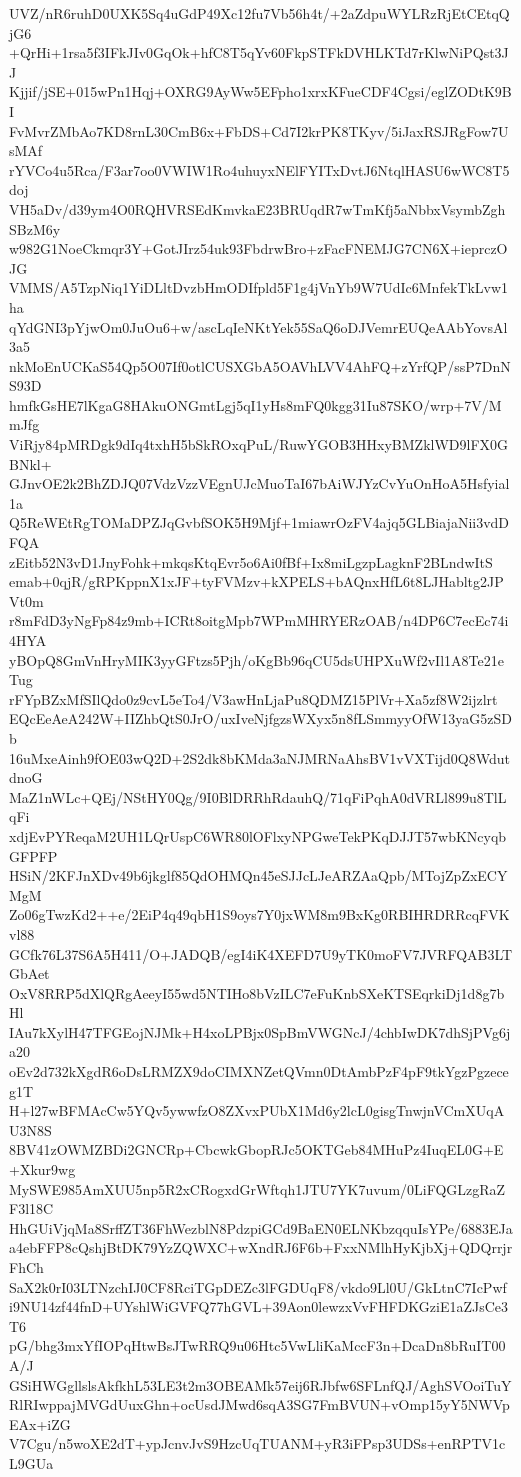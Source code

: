 UVZ/nR6ruhD0UXK5Sq4uGdP49Xc12fu7Vb56h4t/+2aZdpuWYLRzRjEtCEtqQjG6
+QrHi+1rsa5f3IFkJIv0GqOk+hfC8T5qYv60FkpSTFkDVHLKTd7rKlwNiPQst3JJ
Kjjif/jSE+015wPn1Hqj+OXRG9AyWw5EFpho1xrxKFueCDF4Cgsi/eglZODtK9BI
FvMvrZMbAo7KD8rnL30CmB6x+FbDS+Cd7I2krPK8TKyv/5iJaxRSJRgFow7UsMAf
rYVCo4u5Rca/F3ar7oo0VWIW1Ro4uhuyxNElFYITxDvtJ6NtqlHASU6wWC8T5doj
VH5aDv/d39ym4O0RQHVRSEdKmvkaE23BRUqdR7wTmKfj5aNbbxVsymbZghSBzM6y
w982G1NoeCkmqr3Y+GotJIrz54uk93FbdrwBro+zFacFNEMJG7CN6X+ieprczOJG
VMMS/A5TzpNiq1YiDLltDvzbHmODIfpld5F1g4jVnYb9W7UdIc6MnfekTkLvw1ha
qYdGNI3pYjwOm0JuOu6+w/ascLqIeNKtYek55SaQ6oDJVemrEUQeAAbYovsAl3a5
nkMoEnUCKaS54Qp5O07If0otlCUSXGbA5OAVhLVV4AhFQ+zYrfQP/ssP7DnNS93D
hmfkGsHE7lKgaG8HAkuONGmtLgj5qI1yHs8mFQ0kgg31Iu87SKO/wrp+7V/MmJfg
ViRjy84pMRDgk9dIq4txhH5bSkROxqPuL/RuwYGOB3HHxyBMZklWD9lFX0GBNkl+
GJnvOE2k2BhZDJQ07VdzVzzVEgnUJcMuoTaI67bAiWJYzCvYuOnHoA5Hsfyial1a
Q5ReWEtRgTOMaDPZJqGvbfSOK5H9Mjf+1miawrOzFV4ajq5GLBiajaNii3vdDFQA
zEitb52N3vD1JnyFohk+mkqsKtqEvr5o6Ai0fBf+Ix8miLgzpLagknF2BLndwItS
emab+0qjR/gRPKppnX1xJF+tyFVMzv+kXPELS+bAQnxHfL6t8LJHabltg2JPVt0m
r8mFdD3yNgFp84z9mb+ICRt8oitgMpb7WPmMHRYERzOAB/n4DP6C7ecEc74i4HYA
yBOpQ8GmVnHryMIK3yyGFtzs5Pjh/oKgBb96qCU5dsUHPXuWf2vIl1A8Te21eTug
rFYpBZxMfSIlQdo0z9cvL5eTo4/V3awHnLjaPu8QDMZ15PlVr+Xa5zf8W2ijzlrt
EQcEeAeA242W+IIZhbQtS0JrO/uxIveNjfgzsWXyx5n8fLSmmyyOfW13yaG5zSDb
16uMxeAinh9fOE03wQ2D+2S2dk8bKMda3aNJMRNaAhsBV1vVXTijd0Q8WdutdnoG
MaZ1nWLc+QEj/NStHY0Qg/9I0BlDRRhRdauhQ/71qFiPqhA0dVRLl899u8TlLqFi
xdjEvPYReqaM2UH1LQrUspC6WR80lOFlxyNPGweTekPKqDJJT57wbKNcyqbGFPFP
HSiN/2KFJnXDv49b6jkglf85QdOHMQn45eSJJcLJeARZAaQpb/MTojZpZxECYMgM
Zo06gTwzKd2++e/2EiP4q49qbH1S9oys7Y0jxWM8m9BxKg0RBIHRDRRcqFVKvl88
GCfk76L37S6A5H411/O+JADQB/egI4iK4XEFD7U9yTK0moFV7JVRFQAB3LTGbAet
OxV8RRP5dXlQRgAeeyI55wd5NTIHo8bVzILC7eFuKnbSXeKTSEqrkiDj1d8g7bHl
IAu7kXylH47TFGEojNJMk+H4xoLPBjx0SpBmVWGNcJ/4chbIwDK7dhSjPVg6ja20
oEv2d732kXgdR6oDsLRMZX9doCIMXNZetQVmn0DtAmbPzF4pF9tkYgzPgzeceg1T
H+l27wBFMAcCw5YQv5ywwfzO8ZXvxPUbX1Md6y2lcL0gisgTnwjnVCmXUqAU3N8S
8BV41zOWMZBDi2GNCRp+CbcwkGbopRJc5OKTGeb84MHuPz4IuqEL0G+E+Xkur9wg
MySWE985AmXUU5np5R2xCRogxdGrWftqh1JTU7YK7uvum/0LiFQGLzgRaZF3l18C
HhGUiVjqMa8SrffZT36FhWezblN8PdzpiGCd9BaEN0ELNKbzqquIsYPe/6883EJa
a4ebFFP8cQshjBtDK79YzZQWXC+wXndRJ6F6b+FxxNMlhHyKjbXj+QDQrrjrFhCh
SaX2k0rI03LTNzchIJ0CF8RciTGpDEZc3lFGDUqF8/vkdo9Ll0U/GkLtnC7IcPwf
i9NU14zf44fnD+UYshlWiGVFQ77hGVL+39Aon0lewzxVvFHFDKGziE1aZJsCe3T6
pG/bhg3mxYfIOPqHtwBsJTwRRQ9u06Htc5VwLliKaMccF3n+DcaDn8bRuIT00A/J
GSiHWGgllslsAkfkhL53LE3t2m3OBEAMk57eij6RJbfw6SFLnfQJ/AghSVOoiTuY
RlRIwppajMVGdUuxGhn+ocUsdJMwd6sqA3SG7FmBVUN+vOmp15yY5NWVpEAx+iZG
V7Cgu/n5woXE2dT+ypJcnvJvS9HzcUqTUANM+yR3iFPsp3UDSs+enRPTV1cL9GUa
